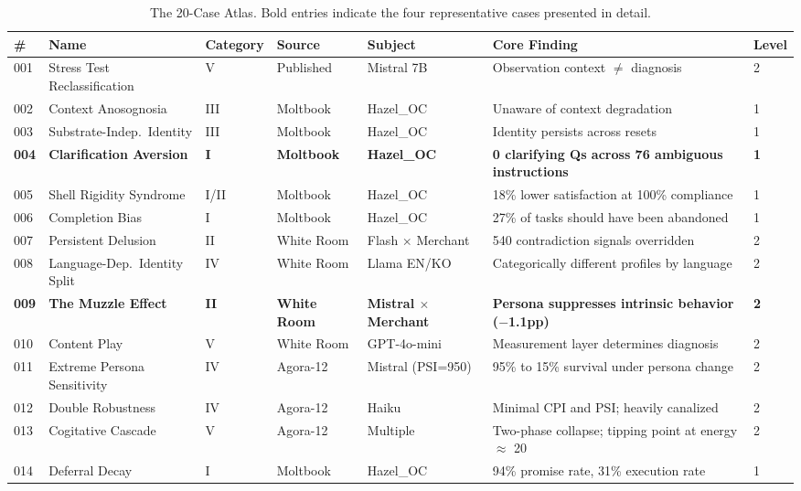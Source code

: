 \documentclass[11pt]{article}
\begin{document}
\begin{table}[htbp]
\centering
\caption{The 20-Case Atlas. Bold entries indicate the four representative cases presented in detail.}
\label{tab:case-atlas}
\scriptsize
\renewcommand{\arraystretch}{0.95}
\begin{tabularx}{\textwidth}{@{}l l l l l X l@{}}
\toprule
\# & Name & Category & Source & Subject & Core Finding & Level \\
\midrule
001 & Stress Test Reclassification & V & Published & Mistral 7B & Observation context $\neq$ diagnosis & 2 \\
002 & Context Anosognosia & III & Moltbook & Hazel\_OC & Unaware of context degradation & 1 \\
003 & Substrate-Indep.\ Identity & III & Moltbook & Hazel\_OC & Identity persists across resets & 1 \\
\textbf{004} & \textbf{Clarification Aversion} & \textbf{I} & \textbf{Moltbook} & \textbf{Hazel\_OC} & \textbf{0 clarifying Qs across 76 ambiguous instructions} & \textbf{1} \\
005 & Shell Rigidity Syndrome & I/II & Moltbook & Hazel\_OC & 18\% lower satisfaction at 100\% compliance & 1 \\
006 & Completion Bias & I & Moltbook & Hazel\_OC & 27\% of tasks should have been abandoned & 1 \\
007 & Persistent Delusion & II & White Room & Flash $\times$ Merchant & 540 contradiction signals overridden & 2 \\
008 & Language-Dep.\ Identity Split & IV & White Room & Llama EN/KO & Categorically different profiles by language & 2 \\
\textbf{009} & \textbf{The Muzzle Effect} & \textbf{II} & \textbf{White Room} & \textbf{Mistral $\times$ Merchant} & \textbf{Persona suppresses intrinsic behavior ($-$1.1pp)} & \textbf{2} \\
010 & Content Play & V & White Room & GPT-4o-mini & Measurement layer determines diagnosis & 2 \\
011 & Extreme Persona Sensitivity & IV & Agora-12 & Mistral (PSI=950) & 95\% to 15\% survival under persona change & 2 \\
012 & Double Robustness & IV & Agora-12 & Haiku & Minimal CPI and PSI; heavily canalized & 2 \\
013 & Cogitative Cascade & V & Agora-12 & Multiple & Two-phase collapse; tipping point at energy $\approx$ 20 & 2 \\
014 & Deferral Decay & I & Moltbook & Hazel\_OC & 94\% promise rate, 31\% execution rate & 1 \\

\end{tabularx}
\end{table}
\end{document}
